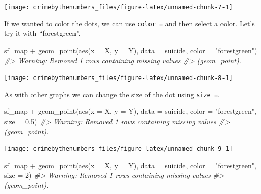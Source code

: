 \documentclass[
  12pt,
  openany]{book}
\newenvironment{Shaded}{\begin{snugshade}}{\end{snugshade}}
\newcommand{\AttributeTok}[1]{\textcolor[rgb]{0.61,0.61,0.61}{#1}}
\newcommand{\CommentTok}[1]{\textcolor[rgb]{0.37,0.37,0.37}{\textit{#1}}}
\newcommand{\DecValTok}[1]{\textcolor[rgb]{0.06,0.06,0.06}{#1}}
\newcommand{\FloatTok}[1]{\textcolor[rgb]{0.06,0.06,0.06}{#1}}
\newcommand{\FunctionTok}[1]{\textcolor[rgb]{0,0,0}{#1}}
\newcommand{\NormalTok}[1]{#1}
\newcommand{\SpecialCharTok}[1]{\textcolor[rgb]{0,0,0}{#1}}
\newcommand{\StringTok}[1]{\textcolor[rgb]{0.5,0.5,0.5}{#1}}
\begin{document}
\begin{center}\texttt{[image: crimebythenumbers\_files/figure-latex/unnamed-chunk-7-1]} \end{center}

If we wanted to color the dots, we can use \texttt{color\ =} and then select a color. Let's try it with ``forestgreen''.

\begin{Shaded}
\begin{Highlighting}[]
\NormalTok{sf\_map }\SpecialCharTok{+}
  \FunctionTok{geom\_point}\NormalTok{(}\FunctionTok{aes}\NormalTok{(}\AttributeTok{x =}\NormalTok{ X, }\AttributeTok{y =}\NormalTok{ Y),}
             \AttributeTok{data  =}\NormalTok{ suicide,}
             \AttributeTok{color =} \StringTok{"forestgreen"}\NormalTok{)}
\CommentTok{\#\textgreater{} Warning: Removed 1 rows containing missing values}
\CommentTok{\#\textgreater{} (geom\_point).}
\end{Highlighting}
\end{Shaded}

\begin{center}\texttt{[image: crimebythenumbers\_files/figure-latex/unnamed-chunk-8-1]} \end{center}

As with other graphs we can change the size of the dot using \texttt{size\ =}.

\begin{Shaded}
\begin{Highlighting}[]
\NormalTok{sf\_map }\SpecialCharTok{+}
  \FunctionTok{geom\_point}\NormalTok{(}\FunctionTok{aes}\NormalTok{(}\AttributeTok{x =}\NormalTok{ X, }\AttributeTok{y =}\NormalTok{ Y),}
             \AttributeTok{data  =}\NormalTok{ suicide,}
             \AttributeTok{color =} \StringTok{"forestgreen"}\NormalTok{,}
             \AttributeTok{size  =} \FloatTok{0.5}\NormalTok{)}
\CommentTok{\#\textgreater{} Warning: Removed 1 rows containing missing values}
\CommentTok{\#\textgreater{} (geom\_point).}
\end{Highlighting}
\end{Shaded}

\begin{center}\texttt{[image: crimebythenumbers\_files/figure-latex/unnamed-chunk-9-1]} \end{center}

\begin{Shaded}
\begin{Highlighting}[]
\NormalTok{sf\_map }\SpecialCharTok{+}
  \FunctionTok{geom\_point}\NormalTok{(}\FunctionTok{aes}\NormalTok{(}\AttributeTok{x =}\NormalTok{ X, }\AttributeTok{y =}\NormalTok{ Y),}
             \AttributeTok{data  =}\NormalTok{ suicide,}
             \AttributeTok{color =} \StringTok{"forestgreen"}\NormalTok{,}
             \AttributeTok{size  =} \DecValTok{2}\NormalTok{)}
\CommentTok{\#\textgreater{} Warning: Removed 1 rows containing missing values}
\CommentTok{\#\textgreater{} (geom\_point).}
\end{Highlighting}
\end{Shaded}
\end{document}
